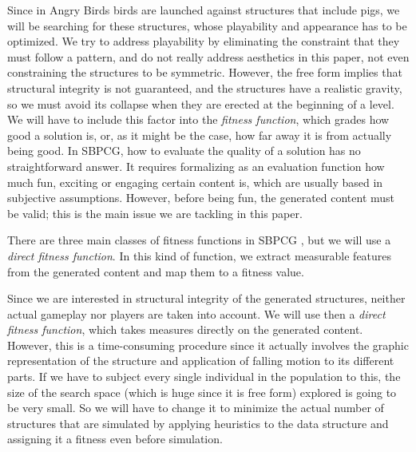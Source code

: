 \documentclass[sigconf]{acmart}
\begin{document}
Since in Angry Birds birds are launched against structures that include pigs,
we will be searching
for these structures, whose playability and appearance has to be
optimized. We try to address playability by eliminating the constraint
that they must follow a pattern, and do not really address aesthetics
in this paper, not even constraining the structures to be
symmetric. However, the free form implies that structural integrity is
not guaranteed, and the structures have a realistic
gravity, so we must avoid its collapse when they are erected at the
beginning of a level. We will have to include this factor into the 
\textit{fitness function}, which grades how good a solution is, or, as
it might be the case, how far away it is from actually being good.
In SBPCG, how to evaluate the quality of a solution has no straightforward 
answer. It requires formalizing as an evaluation function how much fun, 
exciting or engaging certain content is, which are usually based in subjective 
assumptions. However, before being fun, the generated content must be
valid; this is the main issue we are tackling in this paper.

There are three main classes of fitness functions in 
SBPCG \cite{togelius2010search}, but we will use a {\em direct fitness 
function}.
In this kind of function, we extract measurable features from the generated 
content and map them to a fitness value.


Since we are interested in structural integrity of the generated
structures, neither actual gameplay nor players are taken into
account. We will use then a {\em direct fitness function}, which takes
measures directly on the generated content. However, this is a
time-consuming procedure since it actually involves the graphic
representation of the structure and application of falling motion to
its different parts. If we have to subject every single individual in
the population to this, the size of the search space (which is huge
since it is free form) explored is going to be very small. So we will
have to change it to minimize the actual number of structures that are
simulated by applying heuristics to the data structure and assigning
it a fitness even before simulation.
\end{document}
